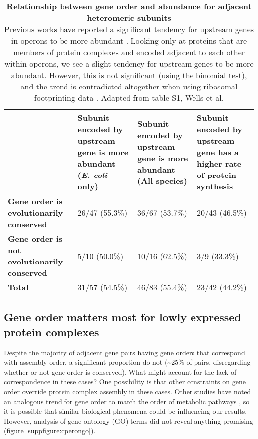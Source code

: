 \documentclass[a4paper,11pt,twoside,openright]{scrbook}
\begin{document}
\begin{table}[h]
    \captionsetup{width=0.9\textwidth}
    \caption[Relationship between gene order and abundance for adjacent heteromeric subunits]{\sffamily \textbf{Relationship between gene order and abundance for adjacent heteromeric subunits} \\ \small Previous works have reported a significant tendency for upstream genes in operons to be more abundant \cite{Nishizaki2007,Lim2011}. Looking only at proteins that are members of protein complexes and encoded adjacent to each other within operons, we see a slight tendency for upstream genes to be more abundant. However, this is not significant (using the binomial test), and the trend is contradicted altogether when using ribosomal footprinting data \cite{Li2014b}. Adapted from table S1, Wells et al. \cite{Wells2016}}
    \centering
    \onehalfspacing
    \begin{tabular}{p{30mm} | p{29mm} p{29mm} p{29mm}}
    \hline
    &  \textbf{Subunit encoded by upstream gene is more abundant (\textit{E. coli} only)}  & \textbf{Subunit encoded by upstream gene is more abundant (All species)} &  \textbf{Subunit encoded by upstream gene has a higher rate of protein synthesis}\\[0.1cm]
    \hline
    \raggedright \textbf{Gene order is evolutionarily conserved} & 26/47 (55.3\%) & 36/67 (53.7\%) &  20/43 (46.5\%)\\
    \raggedright \textbf{Gene order is not evolutionarily conserved} & 5/10 (50.0\%) & 10/16 (62.5\%) & 3/9 (33.3\%)\\
    \raggedright \textbf{Total} & 31/57 (54.5\%) & 46/83 (55.4\%) & 23/42 (44.2\%)\\[0.1cm]
    \hline
    \end{tabular}
    \label{table:abundgeneorder}
\end{table}


\subsection{Gene order matters most for lowly expressed protein complexes}
Despite the majority of adjacent gene pairs having gene orders that correspond with assembly order, a significant proportion do not (\textasciitilde 25\% of pairs, disregarding whether or not gene order is conserved). What might account for the lack of correspondence in these cases? One possibility is that other constraints on gene order override protein complex assembly in these cases. Other studies have noted an analogous trend for gene order to match the order of metabolic pathways \cite{Zaslaver2004,Kovacs2009}, so it is possible that similar biological phenomena could be influencing our results. However, analysis of gene ontology (GO) terms \cite{Huntley2015} did not reveal anything promising (figure \ref{suppfigure:operongo}).
\end{document}
